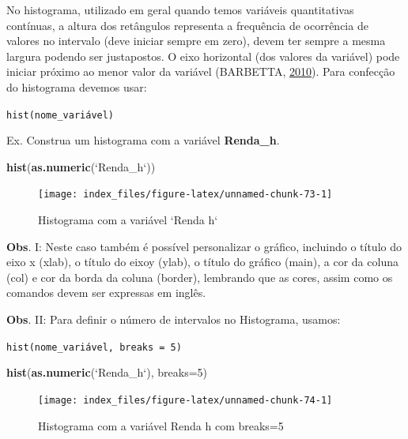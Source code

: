 \documentclass[12pt,brazil,oneside]{book}
\newenvironment{Shaded}{\begin{snugshade}}{\end{snugshade}}
\newcommand{\DataTypeTok}[1]{\textcolor[rgb]{0.13,0.29,0.53}{#1}}
\newcommand{\DecValTok}[1]{\textcolor[rgb]{0.00,0.00,0.81}{#1}}
\newcommand{\KeywordTok}[1]{\textcolor[rgb]{0.13,0.29,0.53}{\textbf{#1}}}
\newcommand{\NormalTok}[1]{#1}
\newcommand{\StringTok}[1]{\textcolor[rgb]{0.31,0.60,0.02}{#1}}
\begin{document}
No histograma, utilizado em geral quando temos variáveis quantitativas
contínuas, a altura dos retângulos representa a frequência de ocorrência
de valores no intervalo (deve iniciar sempre em zero), devem ter sempre
a mesma largura podendo ser justapostos. O eixo horizontal (dos valores
da variável) pode iniciar próximo ao menor valor da variável (BARBETTA,
\protect\hyperlink{ref-barbetta1988}{2010}). Para confecção do
histograma devemos usar:

\texttt{hist(nome\_variável)}

Ex. Construa um histograma com a variável \textbf{Renda\_h}.

\begin{Shaded}
\begin{Highlighting}[]
\KeywordTok{hist}\NormalTok{(}\KeywordTok{as.numeric}\NormalTok{(}\StringTok{`}\DataTypeTok{Renda_h}\StringTok{`}\NormalTok{))}
\end{Highlighting}
\end{Shaded}

\begin{figure}[H]

{\centering \texttt{[image: index\_files/figure-latex/unnamed-chunk-73-1]} 

}

\caption{Histograma com a variável `Renda h`}\label{fig:unnamed-chunk-73}
\end{figure}

\textbf{Obs}. I: Neste caso também é possível personalizar o gráfico,
incluindo o título do eixo x (xlab), o título do eixoy (ylab), o título
do gráfico (main), a cor da coluna (col) e cor da borda da coluna
(border), lembrando que as cores, assim como os comandos devem ser
expressas em inglês.

\textbf{Obs}. II: Para definir o número de intervalos no Histograma,
usamos:

\texttt{hist(nome\_variável,\ breaks\ =\ 5)}

\begin{Shaded}
\begin{Highlighting}[]
\KeywordTok{hist}\NormalTok{(}\KeywordTok{as.numeric}\NormalTok{(}\StringTok{`}\DataTypeTok{Renda_h}\StringTok{`}\NormalTok{), }\DataTypeTok{breaks=}\DecValTok{5}\NormalTok{)}
\end{Highlighting}
\end{Shaded}

\begin{figure}[H]

{\centering \texttt{[image: index\_files/figure-latex/unnamed-chunk-74-1]} 

}

\caption{Histograma com a variável Renda h com breaks=5}\label{fig:unnamed-chunk-74}
\end{figure}
\end{document}
